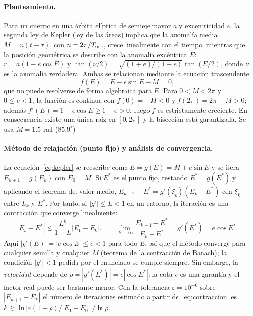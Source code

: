 \documentclass[11pt,a4paper]{article}
\begin{document}
\paragraph{Planteamiento.}
Para un cuerpo en una órbita elíptica de semieje mayor $a$ y excentricidad $e$, la segunda ley de Kepler (ley de las áreas) implica que la anomalía media $M=n(t-\tau)$, con $n=2\pi/T_{\rm orb}$, crece linealmente con el tiempo, mientras que la posición geométrica se describe con la anomalía excéntrica $E$: $r=a(1-e\cos E)$ y $\tan(\nu/2)=\sqrt{(1+e)/(1-e)}\tan(E/2)$, donde $\nu$ es la anomalía verdadera. Ambas se relacionan mediante la ecuación trascendente
\begin{equation}
f(E)=E-e\sin E-M=0, \label{eq:kepler}
\end{equation}
que no puede resolverse de forma algebraica para $E$. Para $0<M<2\pi$ y $0\le e<1$, la función es continua con $f(0)=-M<0$ y $f(2\pi)=2\pi-M>0$; además $f'(E)=1-e\cos E\ge1-e>0$, luego $f$ es estrictamente creciente. En consecuencia existe una única raíz en $[0,2\pi]$ y la bisección está garantizada. Se usa $M=1.5$ rad ($85.9^\circ$).

\paragraph{Método de relajación (punto fijo) y análisis de convergencia.}
La ecuación~\eqref{eq:kepler} se reescribe como $E=g(E)=M+e\sin E$ y se itera $E_{k+1}=g(E_k)$ con $E_0=M$. Si $E^*$ es el punto fijo, restando $E^*=g(E^*)$ y aplicando el teorema del valor medio, $E_{k+1}-E^*=g'(\xi_k)(E_k-E^*)$ con $\xi_k$ entre $E_k$ y $E^*$. Por tanto, si $|g'|\le L<1$ en un entorno, la iteración es una contracción que converge linealmente:
\begin{equation}
|E_k-E^*|\le\frac{L^k}{1-L}|E_1-E_0|,\qquad \lim_{k\to\infty}\frac{E_{k+1}-E^*}{E_k-E^*}=g'(E^*)=e\cos E^*. \label{eq:contraccion}
\end{equation}
Aquí $|g'(E)|=|e\cos E|\le e<1$ para todo $E$, así que el método converge para cualquier semilla y cualquier $M$ (teorema de la contracción de Banach); la condición $|g'|<1$ pedida por el enunciado se cumple siempre. Sin embargo, la \emph{velocidad} depende de $\rho=|g'(E^*)|=e|\cos E^*|$: la cota $e$ es una garantía y el factor real puede ser bastante menor. Con la tolerancia $\varepsilon=10^{-6}$ sobre $|E_{k+1}-E_k|$ el número de iteraciones estimado a partir de~\eqref{eq:contraccion} es $k\gtrsim\ln\!\big[\varepsilon(1-\rho)/|E_1-E_0|\big]/\ln\rho$.
\end{document}
